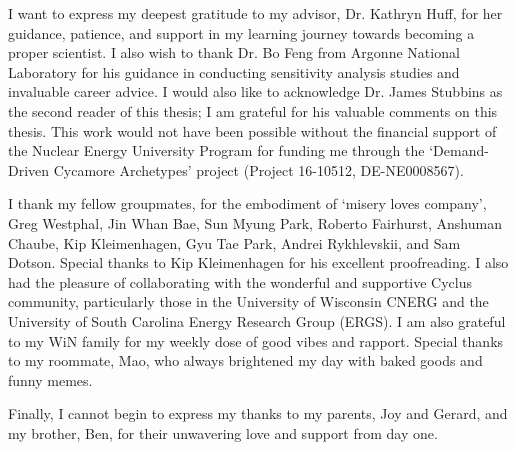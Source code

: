 I want to express my deepest gratitude to my advisor, 
Dr. Kathryn Huff, for her guidance, patience, and 
support in my learning journey towards becoming a proper scientist.
I also wish to thank Dr. Bo Feng from Argonne National 
Laboratory for his guidance in conducting 
sensitivity analysis studies and invaluable career advice.  
I would also like to acknowledge Dr. James Stubbins as the 
second reader of this thesis; I am grateful for his valuable 
comments on this thesis. 
This work would not have been possible without the 
financial support of the Nuclear Energy University Program 
for funding me through the `Demand-Driven Cycamore Archetypes' 
project (Project 16-10512, DE-NE0008567).

I thank my fellow groupmates, for the embodiment of `misery 
loves company', Greg Westphal, Jin Whan Bae, Sun Myung Park, 
Roberto Fairhurst, Anshuman Chaube, Kip Kleimenhagen, 
Gyu Tae Park, Andrei Rykhlevskii, and Sam Dotson. 
Special thanks to Kip Kleimenhagen for his excellent proofreading. 
I also had the pleasure of collaborating with the wonderful 
and supportive Cyclus community, particularly those in the 
University of Wisconsin \gls{CNERG} and the University of 
South Carolina Energy Research Group (ERGS). 
I am also grateful to my WiN family for my weekly dose 
of good vibes and rapport. 
Special thanks to my roommate, Mao, who always brightened my 
day with baked goods and funny memes. 

Finally, I cannot begin to express my thanks to my parents, 
Joy and Gerard, and my brother, Ben, for their unwavering love 
and support from day one. 


